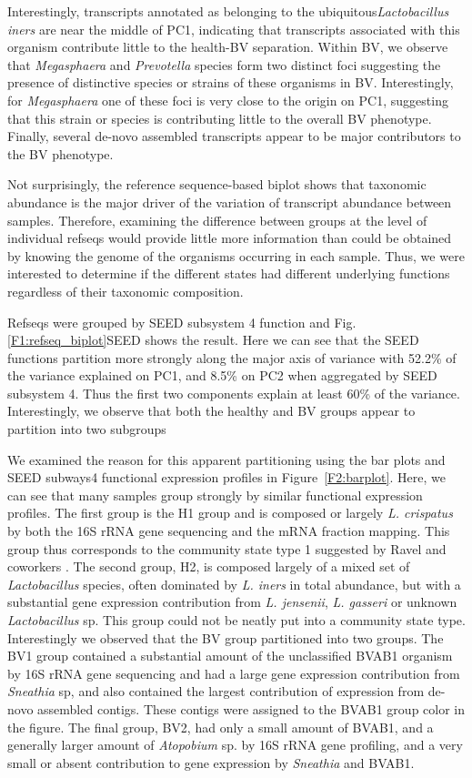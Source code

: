 \documentclass[10pt,letterpaper]{article}
\begin{document}
Interestingly, transcripts annotated as belonging to the ubiquitous\emph{Lactobacillus iners} are near the middle of PC1, indicating that transcripts associated with this organism contribute little to the health-BV separation.  Within BV, we observe that \emph{Megasphaera} and \emph{Prevotella} species form two distinct foci suggesting the presence of distinctive species or strains of these organisms in BV. Interestingly, for \emph{Megasphaera} one of these foci is very close to the origin on PC1, suggesting that this strain or species is contributing little to the overall BV phenotype. Finally, several de-novo assembled transcripts appear to be major contributors to the BV phenotype.

Not surprisingly, the reference sequence-based biplot shows that taxonomic abundance is the major driver of the variation of transcript abundance between samples. Therefore, examining the difference between groups at the level of individual refseqs would provide little more information than could be obtained by knowing the genome of the organisms occurring in each sample. Thus, we were interested to determine if the different states had different underlying functions regardless of their taxonomic composition. 

Refseqs were grouped by SEED subsystem 4 function \cite{Aziz:2008} and Fig. \ref{F1:refseq_biplot}SEED shows the result.  Here we can see that the SEED functions partition more strongly along the major axis of variance with 52.2\% of the variance explained on PC1, and 8.5\% on PC2 when aggregated by SEED subsystem 4.  Thus the first two components explain at least 60\% of the variance. Interestingly, we observe that both the healthy and BV groups appear to partition into two subgroups

We examined the reason for this apparent partitioning using the bar plots and SEED subways4 functional expression profiles in Figure~\ref{F2:barplot}.  Here, we can see that many samples group strongly by similar functional expression profiles. The first group is the H1 group and is composed or largely \emph{L. crispatus} by both the 16S rRNA gene sequencing and the mRNA fraction mapping. This group thus corresponds to the community state type 1 suggested by Ravel and coworkers \cite{Ravel:2010}. The second group, H2, is composed largely of a mixed set of \emph{Lactobacillus} species, often dominated by \emph{L. iners} in total abundance, but with a substantial gene expression contribution from \emph{L. jensenii}, \emph{L. gasseri} or unknown \emph{Lactobacillus} sp. This group could not be neatly put into a community state type. Interestingly we observed that the BV group partitioned into two groups. The BV1 group contained a substantial amount of the unclassified BVAB1 organism by 16S rRNA gene sequencing and had a large gene expression contribution from \emph{Sneathia} sp, and also contained the largest contribution of expression from de-novo assembled contigs. These contigs were assigned to the BVAB1 group color in the figure. The final group, BV2, had only a small amount of BVAB1, and a generally larger amount of \emph{Atopobium} sp. by 16S rRNA gene profiling, and a very small or absent contribution to gene expression by \emph{Sneathia} and BVAB1. 
\end{document}
